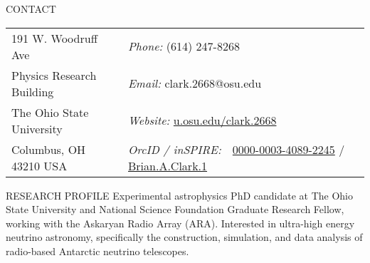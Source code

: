 \documentclass{resume} %
\begin{document}

\vspace{-.75cm}
\begin{rSection}{CONTACT}
\begin{tabular}{@{}p{2in}p{4in}}
191 W. Woodruff Ave             & {\it Phone:}  (614) 247-8268 \\            
Physics Research Building   & {\it Email:}  clark.2668@osu.edu 
 \\         
The Ohio State University & {\it Website:} \url{u.osu.edu/clark.2668} \\       
Columbus, OH  43210 USA  & {\it OrcID / inSPIRE:} \,\,      \href{https://orcid.org/0000-0003-4089-2245}{0000-0003-4089-2245}  / \href{https://inspirehep.net/author/profile/Brian.A.Clark.1}{Brian.A.Clark.1}\\     
\end{tabular}
\end{rSection}


\begin{rSection}{RESEARCH PROFILE}
Experimental astrophysics PhD candidate at The Ohio State University and National Science Foundation Graduate Research Fellow, working with the Askaryan Radio Array (ARA). Interested in ultra-high energy neutrino astronomy, specifically the construction, simulation, and data analysis of radio-based Antarctic neutrino telescopes.
\end{rSection}
\end{document}
